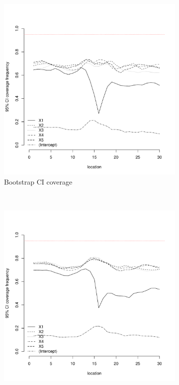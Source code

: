 \documentclass[authoryear, review, 11pt]{elsarticle}
\begin{document}
\begin{figure}
	\vspace{-30mm}
	\centering
	\begin{subfigure}[b]{0.45\textwidth}
	\centering
		\includegraphics[width=\textwidth]{../../figures/simulation/15.17.profile_bootstrap_coverage.pdf}
		\caption{Bootstrap CI coverage}
	\end{subfigure}%
	~ %
	\begin{subfigure}[b]{0.45\textwidth}
	\centering
		\includegraphics[width=\textwidth]{../../figures/simulation/15.17.profile_se_coverage.pdf}

\end{subfigure}
\end{figure}
\end{document}
